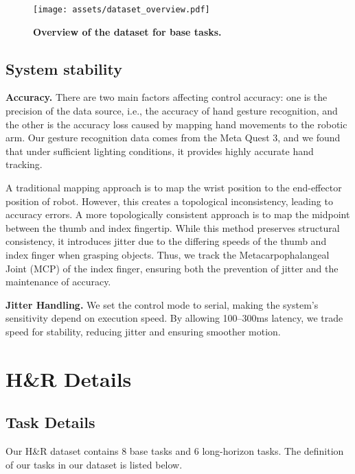 \begin{figure*}[h]
\centering
\texttt{[image: assets/dataset\_overview.pdf]}
\vspace{-1.6em}
\caption{\textbf{Overview of the dataset for base tasks.} }
\vspace{-1em}
\label{fig:dataset_overview}
\end{figure*}

\subsection{System stability}
\label{supp:sys_sta}
\noindent\textbf{Accuracy.} 
There are two main factors affecting control accuracy: one is the precision of the data source, i.e., the accuracy of hand gesture recognition, and the other is the accuracy loss caused by mapping hand movements to the robotic arm. Our gesture recognition data comes from the Meta Quest 3, and we found that under sufficient lighting conditions, it provides highly accurate hand tracking.

A traditional mapping approach is to map the wrist position to the  end-effector position of robot. However, this creates a topological inconsistency, leading to accuracy errors. A more topologically consistent approach is to map the midpoint between the thumb and index fingertip. While this method preserves structural consistency, it introduces jitter due to the differing speeds of the thumb and index finger when grasping objects. Thus, we track the Metacarpophalangeal Joint (MCP) of the index finger, ensuring both the prevention of jitter and the maintenance of accuracy.

\noindent\textbf{Jitter Handling.}
We set the control mode to serial, making the system’s sensitivity depend on execution speed. By allowing 100–300ms latency, we trade speed for stability, reducing jitter and ensuring smoother motion.





\section{H\&R Details}
\label{supp:dataset}
\subsection{Task Details}
Our H\&R dataset contains 8 base tasks and 6 long-horizon tasks. The definition of our tasks in our dataset is listed below.

